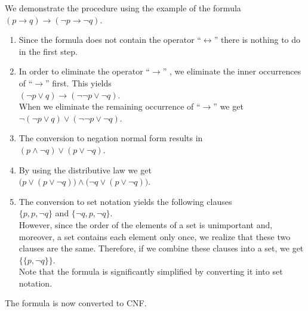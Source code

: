 We demonstrate the procedure using the example of the formula\\[0.2cm]
\hspace*{1.3cm} $(p \rightarrow q) \rightarrow (\neg p \rightarrow \neg q)$.
\begin{enumerate}
\item Since the formula does not contain the operator ``$\leftrightarrow$''
      there is nothing to do in the first step.
\item In order to eliminate the operator ``$\rightarrow$'' , we eliminate the inner occurrences of
      ``$\rightarrow$'' first.  This yields
      \\[0.2cm]
      \hspace*{1.3cm} $(\neg p \vee q) \rightarrow (\neg \neg p \vee \neg q)$.
      \\[0.2cm]
      When we eliminate the remaining occurrence of ``$\rightarrow$''  we get
      \\[0.2cm]
      \hspace*{1.3cm} $\neg (\neg p \vee q) \vee (\neg \neg p \vee \neg q)$.
\item The conversion to negation normal form results in \\[0.2cm]
      \hspace*{1.3cm} $(p \wedge \neg q) \vee (p \vee \neg q)$.
\item By using the distributive law we get \\[0.2cm]
      \hspace*{1.3cm} $\bigl(p \vee (p \vee \neg q)\bigr) \wedge \bigl(\neg q \vee (p \vee \neg q)\bigr)$.
\item The conversion to set notation yields the following clauses \\[0.2cm] 
      \hspace*{1.3cm} $\{p, p, \neg q\}$ \quad and \quad $\{\neg q, p, \neg q\}$. \\[0.2cm]
      However, since the order of the elements of a set is unimportant and, moreover, a set
      contains each element only once, we realize that these two clauses are the same.
      Therefore, if we combine these clauses into a set, we get \\[0.2cm]
      \hspace*{1.3cm} $\bigl\{ \{p, \neg q\} \bigr\}$. \\[0.2cm]
      Note that the formula is significantly simplified by converting it into set
      notation.
\end{enumerate}
The formula is now converted to CNF.

